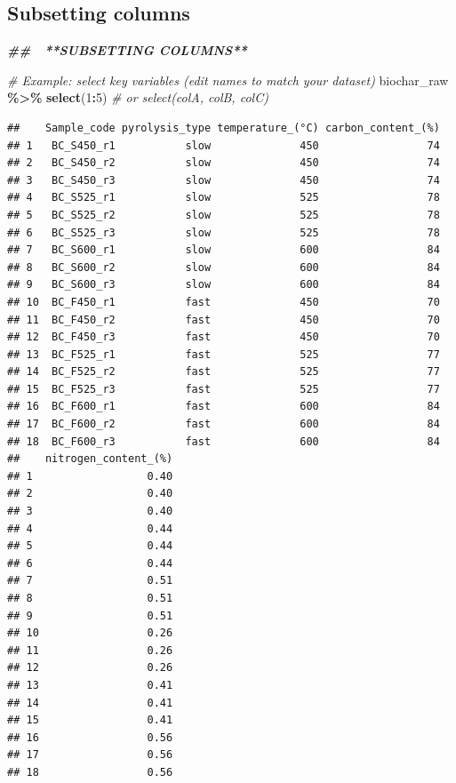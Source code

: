 \documentclass[
]{article}
\newenvironment{Shaded}{\begin{snugshade}}{\end{snugshade}}
\newcommand{\CommentTok}[1]{\textcolor[rgb]{0.56,0.35,0.01}{\textit{#1}}}
\newcommand{\DecValTok}[1]{\textcolor[rgb]{0.00,0.00,0.81}{#1}}
\newcommand{\DocumentationTok}[1]{\textcolor[rgb]{0.56,0.35,0.01}{\textbf{\textit{#1}}}}
\newcommand{\FunctionTok}[1]{\textcolor[rgb]{0.13,0.29,0.53}{\textbf{#1}}}
\newcommand{\NormalTok}[1]{#1}
\newcommand{\SpecialCharTok}[1]{\textcolor[rgb]{0.81,0.36,0.00}{\textbf{#1}}}
\begin{document}
\subsection{Subsetting columns}\label{subsetting-columns}

\begin{Shaded}
\begin{Highlighting}[]
\DocumentationTok{\#\# 🧱 **SUBSETTING COLUMNS**}

\CommentTok{\# Example: select key variables (edit names to match your dataset)}
\NormalTok{biochar\_raw }\SpecialCharTok{\%\textgreater{}\%} 
  \FunctionTok{select}\NormalTok{(}\DecValTok{1}\SpecialCharTok{:}\DecValTok{5}\NormalTok{)   }\CommentTok{\# or select(colA, colB, colC)}
\end{Highlighting}
\end{Shaded}

\begin{verbatim}
##    Sample_code pyrolysis_type temperature_(°C) carbon_content_(%)
## 1   BC_S450_r1           slow              450                 74
## 2   BC_S450_r2           slow              450                 74
## 3   BC_S450_r3           slow              450                 74
## 4   BC_S525_r1           slow              525                 78
## 5   BC_S525_r2           slow              525                 78
## 6   BC_S525_r3           slow              525                 78
## 7   BC_S600_r1           slow              600                 84
## 8   BC_S600_r2           slow              600                 84
## 9   BC_S600_r3           slow              600                 84
## 10  BC_F450_r1           fast              450                 70
## 11  BC_F450_r2           fast              450                 70
## 12  BC_F450_r3           fast              450                 70
## 13  BC_F525_r1           fast              525                 77
## 14  BC_F525_r2           fast              525                 77
## 15  BC_F525_r3           fast              525                 77
## 16  BC_F600_r1           fast              600                 84
## 17  BC_F600_r2           fast              600                 84
## 18  BC_F600_r3           fast              600                 84
##    nitrogen_content_(%)
## 1                  0.40
## 2                  0.40
## 3                  0.40
## 4                  0.44
## 5                  0.44
## 6                  0.44
## 7                  0.51
## 8                  0.51
## 9                  0.51
## 10                 0.26
## 11                 0.26
## 12                 0.26
## 13                 0.41
## 14                 0.41
## 15                 0.41
## 16                 0.56
## 17                 0.56
## 18                 0.56
\end{verbatim}
\end{document}
